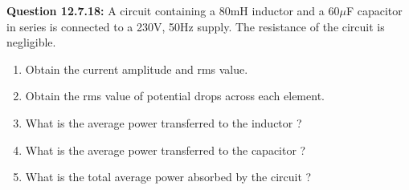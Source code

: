 \documentclass[a4,12pt,onecolumn]{IEEEtran}
\begin{document}
\textbf{Question 12.7.18:}
A circuit containing a 80mH inductor and a 60$\mu$F capacitor in series is connected to a 230V, 50Hz supply. The resistance of the circuit is negligible.\\
\begin{enumerate}
\item Obtain the current amplitude and rms value.
\item Obtain the rms value of potential drops across each element.
\item What is the average power transferred to the inductor ?
\item What is the average power transferred to the capacitor ?
\item What is the total average power absorbed by the circuit ? 
\end{enumerate}
\\
\vspace{0.5mm}
\solution\\


\end{document}
